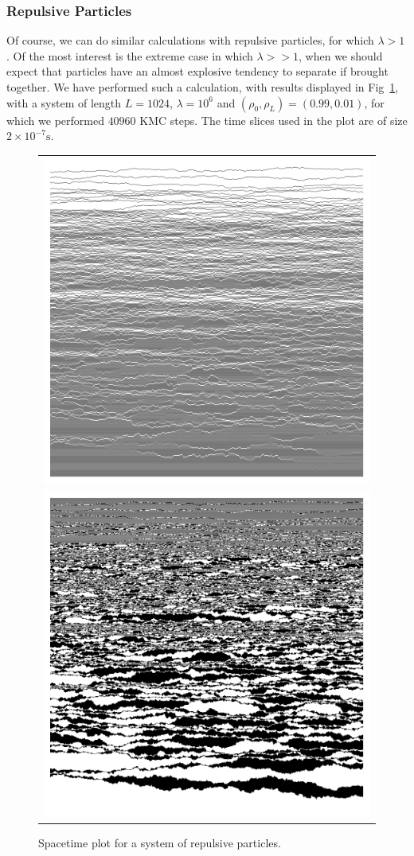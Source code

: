 \subsubsection{Repulsive Particles}
Of course, we can do similar calculations with repulsive particles, for which $\lambda > 1$. Of the most
interest is the extreme case in which $\lambda >> 1$, when we should expect that particles have an almost 
explosive tendency to separate if brought together. We have performed such a calculation, with results
displayed in Fig~\ref{fig:1DRepulsePlots}, with a system
of length $L=1024$, $\lambda = 10^6$ and $(\rho_0 , \rho_L) = (0.99, 0.01)$, for which we performed $40960$
KMC steps. The time slices used in the plot are of size  $2 \times 10^{-7} \mathrm{s}$.
\begin{figure} \caption[The flow pattern of repulsive particles in $1$D]{Spacetime plot for a system of 
repulsive particles.} 
\label{fig:1DRepulsePlots}
\begin{center}
\begin{tabular}{c} 
\includegraphics[width=0.8\linewidth]{numerics/images/stickyParticleFlows/aprilFlowStraight.png} \\
\includegraphics[width=0.8\linewidth]{numerics/images/stickyParticleFlows/aprilFlowDomains.png} \\

\end{tabular}
\end{center}
\end{figure}
